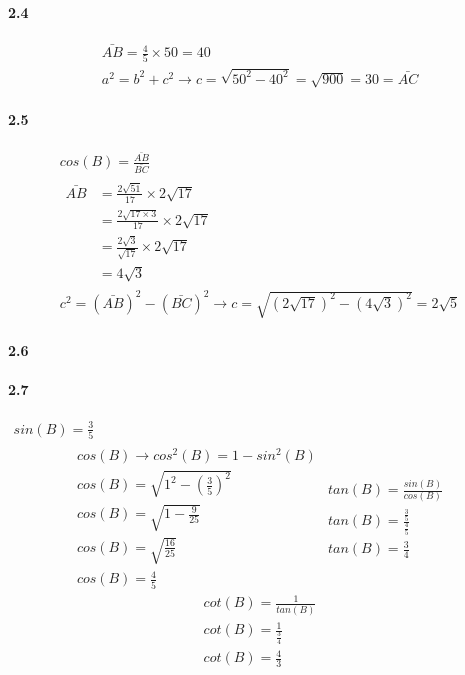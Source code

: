  \paragraph{2.4}

 \begin{gather}
   \bar{AB} = \frac{4}{5} \times 50 = 40 \\
   a^2 = b^2 + c^2 \rightarrow c = \sqrt{50^2 - 40^2} = \sqrt{900} = 30 = \bar{AC} 
 \end{gather}

 \paragraph{2.5}

 \begin{gather}
  cos(B) = \frac{\bar{AB}}{\bar{BC}} \\
  \begin{align}
    \bar{AB} &= \frac{2 \sqrt{51}}{17} \times 2 \sqrt{17} \\
             &= \frac{2 \sqrt{17 \times 3}}{17} \times 2 \sqrt{17} \\
             &= \frac{2 \sqrt{3}}{\sqrt{17}} \times 2 \sqrt{17} \\
             &= 4 \sqrt{3}       
  \end{align} \\
  c^2 = (\bar{AB})^2 - (\bar{BC})^2 \rightarrow c = \sqrt{(2 \sqrt{17})^2 - (4 \sqrt{3})^2} = 2 \sqrt{5} 
 \end{gather}

 \paragraph{2.6}

 \paragraph{2.7}

 \begin{gather}
  sin(B) = \frac{3}{5} \\
  \begin{align}  
    cos(B) \rightarrow cos^2(B) = 1 - sin^2(B) \\
    cos(B) = \sqrt{1^2 - (\frac{3}{5})^2} \\
    cos(B) = \sqrt{1 - \frac{9}{25}} \\
    cos(B) = \sqrt{\frac{16}{25}} \\
    cos(B) = \frac{4}{5}
  \end{align}
  \begin{align}
    tan(B) = \frac{sin(B)}{cos(B)} \\
    tan(B) = \frac{\frac{3}{5}}{\frac{4}{5}} \\
    tan(B) = \frac{3}{4}
  \end{align}
  \begin{align}
    cot(B) = \frac{1}{tan(B)} \\
    cot(B) = \frac{1}{\frac{3}{4}} \\
    cot(B) = \frac{4}{3}
  \end{align}
 \end{gather}


